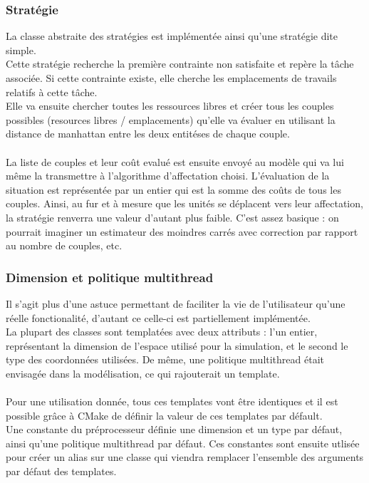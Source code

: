 \subsubsection{Stratégie}

La classe abstraite des stratégies est implémentée ainsi qu'une stratégie dite simple.\\
Cette stratégie recherche la première contrainte non satisfaite et repère la tâche associée. Si cette contrainte existe, elle cherche les emplacements de travails relatifs à cette tâche.\\
Elle va ensuite chercher toutes les ressources libres et créer tous les couples possibles (resources libres / emplacements) qu'elle va évaluer en utilisant la distance de manhattan entre les deux entitéses de chaque couple.\\\\

La liste de couples et leur coût evalué est ensuite envoyé au modèle qui va lui même la transmettre à l'algorithme d'affectation choisi. L'évaluation de la situation est représentée par un entier qui est la somme des coûts de tous les couples. Ainsi, au fur et à mesure que les unités se déplacent vers leur affectation, la stratégie renverra une valeur d'autant plus faible. C'est assez basique : on pourrait imaginer un estimateur des moindres carrés avec correction par rapport au nombre de couples, etc.

\subsubsection{Dimension et politique multithread}

Il s'agit plus d'une astuce permettant de faciliter la vie de l'utilisateur qu'une réelle fonctionalité, d'autant ce celle-ci est partiellement implémentée.\\
La plupart des classes sont templatées avec deux attributs : l'un entier, représentant la dimension de l'espace utilisé pour la simulation, et le second le type des coordonnées utilisées. De même, une politique multithread était envisagée dans la modélisation, ce qui rajouterait un template.\\\\

Pour une utilisation donnée, tous ces templates vont être identiques et il est possible grâce à CMake de définir la valeur de ces templates par défault.\\
Une constante du préprocesseur définie une dimension et un type par défaut, ainsi qu'une politique multithread par défaut. Ces constantes sont ensuite utlisée pour créer un alias sur une classe qui viendra remplacer l'ensemble des arguments par défaut des templates.\\\\

